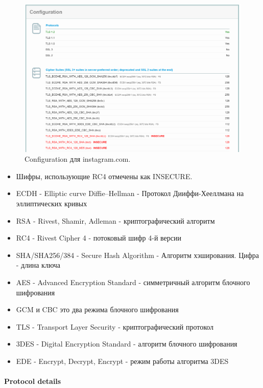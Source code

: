 \documentclass[10pt,a4paper]{article}
\begin{document}
\begin{figure}[h]
\centering
\includegraphics[width=\textwidth]{instagram_com_configuration}
\caption{Configuration для instagram.com.}
\end{figure}

\begin{itemize}
\item{Шифры, использующие RC4 отмечены как INSECURE.}
\item{ECDH - Elliptic curve Diffie–Hellman - Протокол Дииффи-Хееллмана на эллиптических кривых}
\item{RSA - Rivest, Shamir, Adleman - криптографический алгоритм}
\item{RC4 - Rivest Cipher 4 -  потоковый шифр 4-й версии}
\item{SHA/SHA256/384 - Secure Hash Algorithm - Алгоритм хэширования. Цифра - длина ключа}
\item{AES - Advanced Encryption Standard - симметричный алгоритм блочного шифрования}
\item{GCM и CBC это два режима блочного шифрования}
\item{TLS - Transport Layer Security - криптографический протокол}
\item{3DES - Digital Encryption Standard - алгоритм блочного шифрования}
\item{EDE - Encrypt, Decrypt, Encrypt - режим работы алгоритма 3DES}
\end{itemize}

\paragraph{Protocol details\\}
\end{document}
